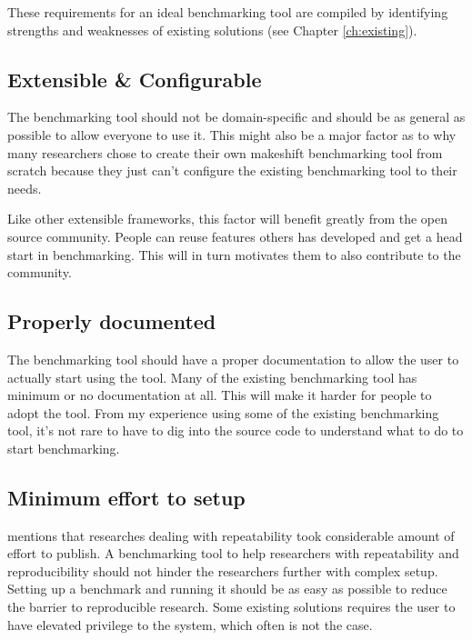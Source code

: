 These requirements for an ideal benchmarking tool are compiled by identifying strengths and weaknesses of existing solutions (see Chapter \ref{ch:existing}).

\subsection{Extensible \& Configurable}
The benchmarking tool should not be domain-specific and should be as general as possible to allow everyone to use it.
This might also be a major factor as to why many researchers chose to create their own makeshift benchmarking tool from scratch because they just can't configure the existing benchmarking tool to their needs.

Like other extensible frameworks, this factor will benefit greatly from the open source community. People can reuse features others has developed and get a head start in benchmarking. This will in turn motivates them to also contribute to the community.

\subsection{Properly documented}
The benchmarking tool should have a proper documentation to allow the user to actually start using the tool.
Many of the existing benchmarking tool has minimum or no documentation at all.
This will make it harder for people to adopt the tool.
From my experience using some of the existing benchmarking tool, it's not rare to have to dig into the source code to understand what to do to start benchmarking.

\subsection{Minimum effort to setup}
\citet{vitekR3RepeatabilityReproducibility2012} mentions that researches dealing with repeatability took considerable amount of effort to publish.
A benchmarking tool to help researchers with repeatability and reproducibility should not hinder the researchers further with complex setup.
Setting up a benchmark and running it should be as easy as possible to reduce the barrier to reproducible research.
Some existing solutions requires the user to have elevated privilege to the system, which often is not the case.

